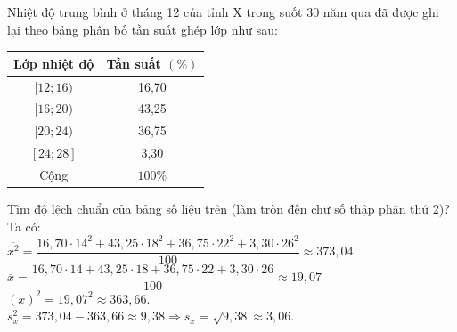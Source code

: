 \begin{bt}%

Nhiệt độ trung bình ở tháng 12 của tỉnh X trong suốt 30 năm qua đã được ghi lại theo bảng phân bố tần suất ghép lớp như sau:
\begin{center} 
	\begin{tabular}{|c|c|}\hline
		{Lớp nhiệt độ}&{Tần suất $(\%)$}\\
		\hline
		{$[12;16)$}&{16,70}\\
		\hline
		{$[16;20)$}&{43,25}\\
		\hline
		{$[20;24)$}&{36,75}\\
		\hline
		{$[24;28]$}&{3,30}\\
		\hline
		{Cộng}&{$100\%$}\\
		\hline
	\end{tabular}
\end{center}
Tìm độ lệch chuẩn của bảng số liệu trên (làm tròn đến chữ số thập phân thứ 2)?
\loigiai
{Ta có:\\
	$\overline{x^2}=\dfrac{16{,}70\cdot 14^2+43{,}25\cdot 18^2+36{,}75\cdot 22^2+3{,}30\cdot 26^2}{100}\approx373{,}04$.\\
	$\overline{x}=\dfrac{16{,}70\cdot 14+43{,}25\cdot 18+36{,}75\cdot 22+3{,}30\cdot 26}{100}\approx19{,}07$\\
	$(\overline{x})^2=19{,}07^2\approx363{,}66$.\\
	$s_x^2=373{,}04-363{,}66\approx9{,}38 \Rightarrow s_x=\sqrt{9{,}38}\approx 3{,}06$.
}
\end{bt}

